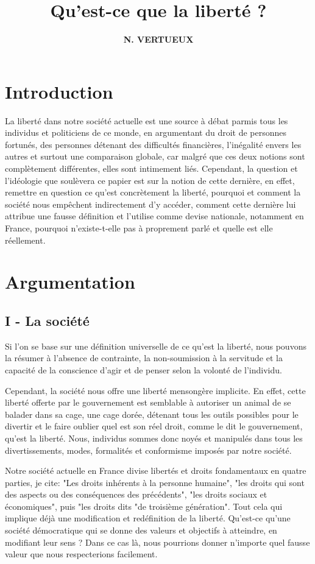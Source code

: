 \documentclass[twocolumn, french]{article}
\author{\large{\textbf{N. VERTUEUX}}}
\title{
  \fontsize{30pt}{36pt}\selectfont \textbf{Qu'est-ce que la liberté ?}
}
\begin{document}
\maketitle
\section*{Introduction}

La liberté dans notre société actuelle est une source à débat parmis tous les individus
et politiciens de ce monde, en argumentant du droit de personnes fortunés, des personnes
détenant des difficultés financières, l'inégalité envers les autres et surtout une 
comparaison globale, car malgré que ces deux notions sont complètement différentes, elles
sont intimement liés. Cependant, la question et l'idéologie que soulèvera ce papier est 
sur la notion de cette dernière, en effet, remettre en question ce qu'est concrètement la 
liberté, pourquoi et comment la société nous empêchent indirectement d'y accéder, comment 
cette dernière lui attribue une fausse définition et l'utilise comme devise nationale, 
notamment en France, pourquoi n'existe-t-elle pas à proprement parlé et quelle est elle 
réellement. 
\section*{Argumentation}
\subsection*{I - La société}
Si l'on se base sur une définition universelle de ce qu'est la liberté, nous pouvons la 
résumer à l'absence de contrainte, la non-soumission à la servitude et la capacité de la 
conscience d'agir et de penser selon la volonté de l'individu. 


Cependant, la société nous offre une liberté mensongère implicite. En effet, cette liberté 
offerte par le gouvernement est semblable à autoriser un animal de se balader dans sa cage, 
une cage dorée, détenant tous les outils possibles pour le divertir et le faire oublier quel 
est son réel droit, comme le dit le gouvernement, qu'est la liberté. 
Nous, individus sommes donc noyés et manipulés dans tous les divertissements, modes, 
formalités et conformisme imposés par notre société.

Notre société actuelle en France divise libertés et droits fondamentaux en quatre parties, 
je cite: "Les droits inhérents à la personne humaine", "les droits qui sont des aspects ou 
des conséquences des précédents", "les droits sociaux et économiques", puis "les droits dits 
"de troisième génération". Tout cela qui implique déjà une modification et redéfinition de la 
liberté. Qu'est-ce qu'une société démocratique qui se donne des valeurs et objectifs à 
atteindre, en modifiant leur sens ? Dans ce cas là, nous pourrions donner n'importe quel 
fausse valeur que nous respecterions facilement.
\end{document}
